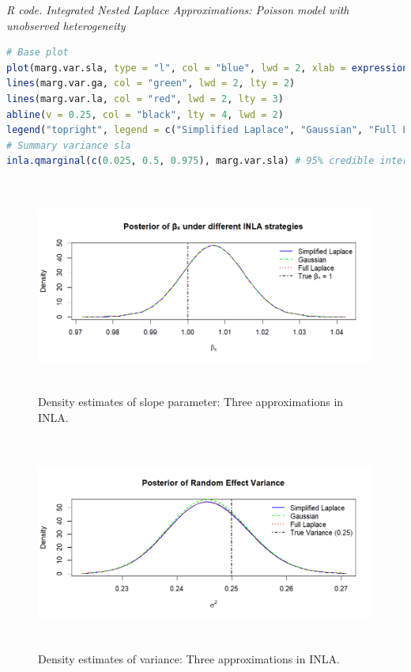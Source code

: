 \begin{tcolorbox}[enhanced,width=4.67in,center upper,
	fontupper=\large\bfseries,drop shadow southwest,sharp corners]
	\textit{R code. Integrated Nested Laplace Approximations: Poisson model with unobserved heterogeneity}
	\begin{VF}
		\begin{lstlisting}[language=R]
# Base plot
plot(marg.var.sla, type = "l", col = "blue", lwd = 2, xlab = expression(sigma^2), ylab = "Density", main = "Posterior of Random Effect Variance")
lines(marg.var.ga, col = "green", lwd = 2, lty = 2)
lines(marg.var.la, col = "red", lwd = 2, lty = 3)
abline(v = 0.25, col = "black", lty = 4, lwd = 2)
legend("topright", legend = c("Simplified Laplace", "Gaussian", "Full Laplace", "True Variance (0.25)"), col = c("blue", "green", "red", "black"), lwd = 2, lty = c(1, 2, 3, 4), bty = "n")
# Summary variance sla
inla.qmarginal(c(0.025, 0.5, 0.975), marg.var.sla) # 95% credible interval
\end{lstlisting}
	\end{VF}
\end{tcolorbox}

\begin{figure}[!h]
	\includegraphics[width=340pt, height=200pt]{Chapters/chapter15/figures/FigINLA1.png}
	\caption[List of figure caption goes here]{Density estimates of slope parameter: Three approximations in INLA.}\label{FigINLA1}
\end{figure} 

\begin{figure}[!h]
	\includegraphics[width=340pt, height=200pt]{Chapters/chapter15/figures/FigINLA2.png}
	\caption[List of figure caption goes here]{Density estimates of variance: Three approximations in INLA.}\label{FigINLA2}
\end{figure} 

